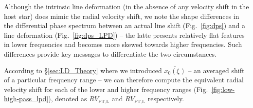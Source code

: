 Although the intrinsic line deformation (in the absence of any velocity shift in the host star) does mimic the radial velocity shift, we note the shape differences in the differential phase spectrum between an actual line shift (Fig.~\ref{fig:dps}) and a line deformation (Fig.~\ref{fig:dps_LPD}) -- the latte presents relatively flat features in lower frequencies and becomes more skewed towards higher frequencies. Such differences provide key messages to differentiate the two circumstances.

According to \S\ref{sec:LD_Theory} where we introduced $\overline{x_0(\xi)}$ -- an averaged shift of a particular frequency range -- we can therefore compute the equivalent radial velocity shift for each of the lower and higher frequency ranges (Fig.~\ref{fig:low-high-pass_lpd}), denoted as $RV_\text{FT,L}$ and $RV_\text{FT,L}$ respectively. 

